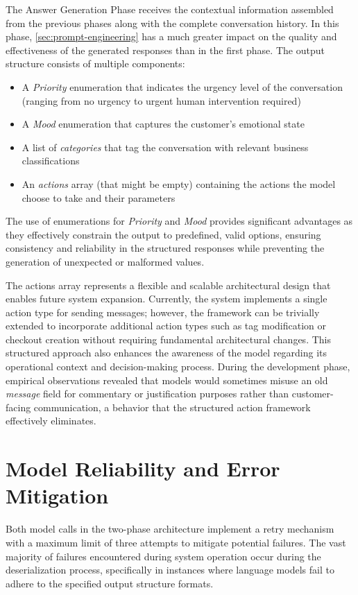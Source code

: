 The Answer Generation Phase receives the contextual information assembled from the previous phases along with the complete conversation history.
In this phase, \cref{sec:prompt-engineering} has a much greater impact on the quality and effectiveness of the generated responses than in the first phase.
The output structure consists of multiple components:
\begin{itemize}
    \item A \textit{Priority} enumeration that indicates the urgency level of the conversation (ranging from no urgency to urgent human intervention required)
    \item A \textit{Mood} enumeration that captures the customer's emotional state
    \item A list of \textit{categories} that tag the conversation with relevant business classifications
    \item An \textit{actions} array (that might be empty) containing the actions the model choose to take and their parameters
\end{itemize}
The use of enumerations for \textit{Priority} and \textit{Mood} provides significant advantages as they effectively constrain the output to predefined, valid options, ensuring consistency and reliability in the structured responses while preventing the generation of unexpected or malformed values.

The actions array represents a flexible and scalable architectural design that enables future system expansion.
Currently, the system implements a single action type for sending messages; however, the framework can be trivially extended to incorporate additional action types such as tag modification or checkout creation without requiring fundamental architectural changes.
This structured approach also enhances the awareness of the model regarding its operational context and decision-making process.
During the development phase, empirical observations revealed that models would sometimes misuse an old \textit{message} field for commentary or justification purposes rather than customer-facing communication, a behavior that the structured action framework effectively eliminates.

\section{Model Reliability and Error Mitigation}
\label{sec:reliability}

Both model calls in the two-phase architecture implement a retry mechanism with a maximum limit of three attempts to mitigate potential failures.
The vast majority of failures encountered during system operation occur during the deserialization process, specifically in instances where language models fail to adhere to the specified output structure formats.

